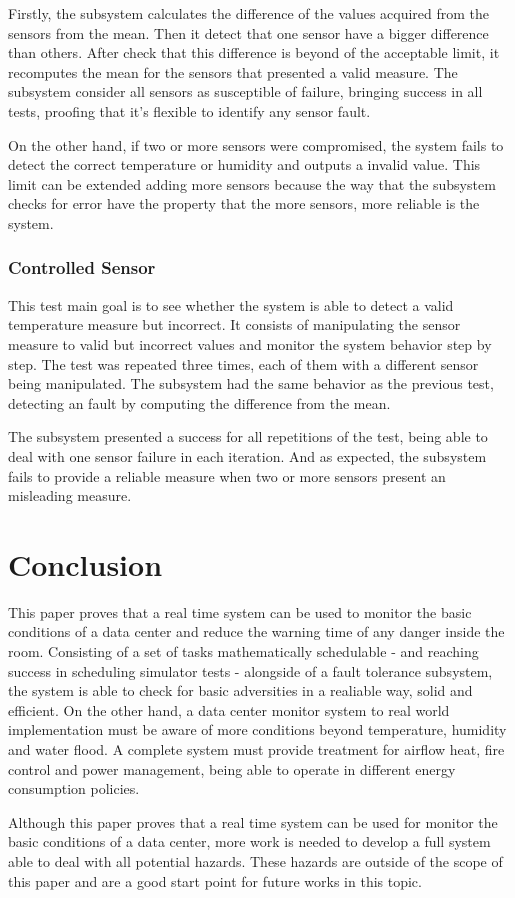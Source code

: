 \documentclass[12pt]{article}
\begin{document}
Firstly, the subsystem calculates the difference of the values acquired from the sensors from the mean. Then it detect
that one sensor have a bigger difference than others. After check that this difference is beyond of the acceptable limit,
it recomputes the mean for the sensors that presented a valid measure. The subsystem consider all sensors as susceptible 
of failure, bringing success in all tests, proofing that it's flexible to identify any sensor fault.

On the other hand, if two or more sensors were compromised, the system fails to detect the correct temperature or humidity 
and outputs a invalid value. This limit can be extended adding more sensors because the way that the subsystem checks for 
error have the property that the more sensors, more reliable is the system.

\subsubsection{Controlled Sensor}
This test main goal is to see whether the system is able to detect a valid temperature measure but incorrect. It consists of
manipulating the sensor measure to valid but incorrect values and monitor the system behavior step by step. The test was 
repeated three times, each of them with a different sensor being manipulated. The subsystem had the same behavior as the
previous test, detecting an fault by computing the difference from the mean.

The subsystem presented a success for all repetitions of the test, being able to deal with one sensor failure in each
iteration. And as expected, the subsystem fails to provide a reliable measure when two or more sensors present an 
misleading measure.

\section{Conclusion}

This paper proves that a real time system can be used to monitor the basic conditions of a data center and reduce the warning
time of any danger inside the room. Consisting of a set of tasks mathematically schedulable - and reaching success in scheduling 
simulator tests - alongside of a fault tolerance subsystem, the system is able to check for basic adversities in a realiable 
way, solid and efficient. On the other hand, a data center monitor system to real world implementation must be aware of more 
conditions beyond temperature, humidity and water flood. A complete system must provide treatment for airflow heat, fire 
control and power management, being able to operate in different energy consumption policies.

Although this paper proves that a real time system can be used for monitor the basic conditions of a data center, more 
work is needed to develop a full system able to deal with all potential hazards. These hazards are outside of the scope of this 
paper and are a good start point for future works in this topic. 



\end{document}
